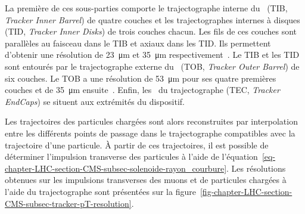 La première de ces sous-parties comporte le trajectographe interne du \CMSbarrel\ (TIB, \emph{Tracker Inner Barrel}) de quatre couches et les trajectographes internes à disques (TID, \emph{Tracker Inner Disks}) de trois couches chacun.
Les fils de ces couches sont parallèles au faisceau dans le TIB et axiaux dans les TID.
Ils permettent d'obtenir une résolution de \SI{23}{\micro\meter} et \SI{35}{\micro\meter} respectivement~\cite{cms_paper}.
Le TIB et les TID sont entourés par le trajectographe externe du \CMSbarrel\ (TOB, \emph{Tracker Outer Barrel}) de six couches.
Le TOB a une résolution de \SI{53}{\micro\meter} pour ses quatre premières couches et de \SI{35}{\micro\meter} ensuite~\cite{cms_paper}.
Enfin, les \CMSendcaps\ du trajectographe (TEC, \emph{Tracker EndCaps}) se situent aux extrémités du dispositif.
\par Les trajectoires des particules chargées sont alors reconstruites par interpolation entre les différents points de passage dans le trajectographe compatibles avec la trajectoire d'une particule.
À partir de ces trajectoires, il est possible de déterminer l'impulsion transverse des particules à l'aide de l'équation~\eqref{eq-chapter-LHC-section-CMS-subsec-solenoide-rayon_courbure}.
Les résolutions obtenues sur les impulsions transverses des muons et de particules chargées à l'aide du trajectographe sont présentées sur la figure~\ref{fig-chapter-LHC-section-CMS-subsec-tracker-pT-resolution}.
